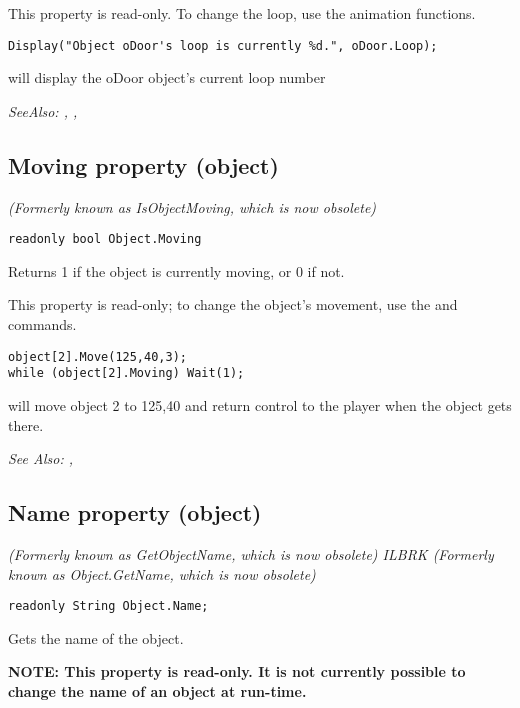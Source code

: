 This property is read-only. To change the loop, use the animation functions.

\begin{verbatim}
Display("Object oDoor's loop is currently %d.", oDoor.Loop);
\end{verbatim}
will display the oDoor object's current loop number

\it{SeeAlso:} ,
,


\subsection{Moving property (object)}\label{Object.Moving}%

\it{(Formerly known as IsObjectMoving, which is now obsolete)}

\begin{verbatim}
readonly bool Object.Moving
\end{verbatim}
Returns 1 if the object is currently moving, or 0 if not.

This property is read-only; to change the object's movement, use the 
and  commands.

\begin{verbatim}
object[2].Move(125,40,3);
while (object[2].Moving) Wait(1);
\end{verbatim}
will move object 2 to 125,40 and return control to the player when the object gets there.

\it{See Also:} ,


\subsection{Name property (object)}\label{Object.Name}%

\it{(Formerly known as GetObjectName, which is now obsolete)} ILBRK
\it{(Formerly known as Object.GetName, which is now obsolete)}

\begin{verbatim}
readonly String Object.Name;
\end{verbatim}
Gets the name of the object.

\bf{NOTE}: This property is read-only. It is not currently possible to change the name
of an object at run-time.

